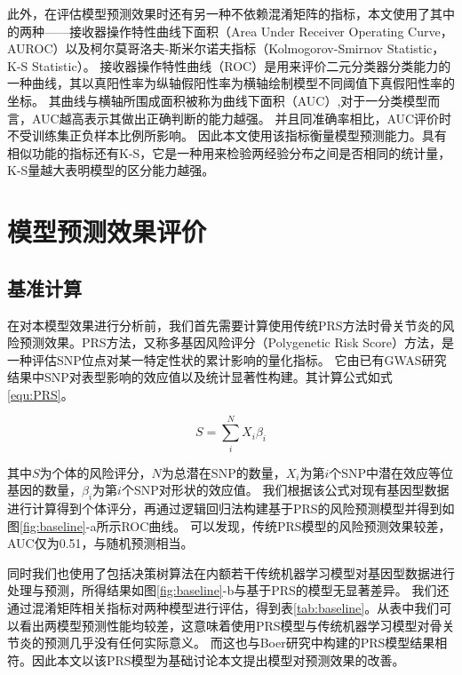 此外，在评估模型预测效果时还有另一种不依赖混淆矩阵的指标，本文使用了其中的两种——接收器操作特性曲线下面积（Area Under Receiver Operating Curve，AUROC）以及柯尔莫哥洛夫-斯米尔诺夫指标（Kolmogorov-Smirnov Statistic，K-S Statistic）。
接收器操作特性曲线（ROC）是用来评价二元分类器分类能力的一种曲线，其以真阳性率为纵轴假阳性率为横轴绘制模型不同阈值下真假阳性率的坐标。
其曲线与横轴所围成面积被称为曲线下面积（AUC）,对于一分类模型而言，AUC越高表示其做出正确判断的能力越强。\cite{fawcett_introduction_2006}
并且同准确率相比，AUC评价时不受训练集正负样本比例所影响。\cite{zou_receiver-operating_2007}
因此本文使用该指标衡量模型预测能力。具有相似功能的指标还有K-S\cite{naaman_tight_2021}，它是一种用来检验两经验分布之间是否相同的统计量，K-S量越大表明模型的区分能力越强。
\section{模型预测效果评价}
\subsection{基准计算}

在对本模型效果进行分析前，我们首先需要计算使用传统PRS方法时骨关节炎的风险预测效果。PRS方法，又称多基因风险评分（Polygenetic Risk Score）方法\cite{dudbridge_power_2013}，是一种评估SNP位点对某一特定性状的累计影响的量化指标。
它由已有GWAS研究结果中SNP对表型影响的效应值以及统计显著性构建。其计算公式如式\ref{equ:PRS}。

\begin{equation}\label{equ:PRS}
    S=\sum_i^N X_i \beta_i
\end{equation}

其中$S$为个体的风险评分，$N$为总潜在SNP的数量，$X_i$为第$i$个SNP中潜在效应等位基因的数量，$\beta_i$为第$i$个SNP对形状的效应值。
我们根据该公式对现有基因型数据进行计算得到个体评分，再通过逻辑回归法构建基于PRS的风险预测模型并得到如图\ref{fig:baseline}-a所示ROC曲线。
可以发现，传统PRS模型的风险预测效果较差，AUC仅为0.51，与随机预测相当。

同时我们也使用了包括决策树算法在内额若干传统机器学习模型对基因型数据进行处理与预测，所得结果如图\ref{fig:baseline}-b与基于PRS的模型无显著差异。
我们还通过混淆矩阵相关指标对两种模型进行评估，得到表\ref{tab:baseline}。从表中我们可以看出两模型预测性能均较差，这意味着使用PRS模型与传统机器学习模型对骨关节炎的预测几乎没有任何实际意义。
而这也与Boer\cite{boer_deciphering_2021}研究中构建的PRS模型结果相符。因此本文以该PRS模型为基础讨论本文提出模型对预测效果的改善。

